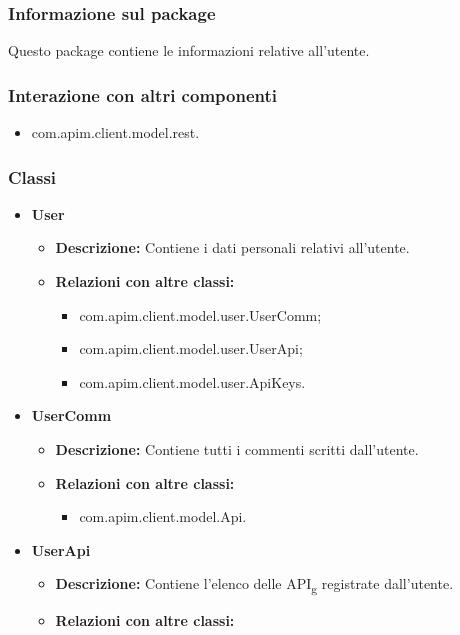 {{		\subsubsection{Informazione sul package}{
			Questo package contiene le informazioni relative all'utente.
		}
		\subsubsection{Interazione con altri componenti}{
			\begin{itemize}
				\item com.apim.client.model.rest.
			\end{itemize}
			\subsubsection{Classi}
			\begin{itemize}
				\item \textbf{User}
				\begin{itemize}
					\item \textbf{Descrizione:} Contiene i dati personali relativi all'utente.
					\item \textbf{Relazioni con altre classi:}
					\begin{itemize}
						\item com.apim.client.model.user.UserComm;
						\item com.apim.client.model.user.UserApi;
						\item com.apim.client.model.user.ApiKeys.
					\end{itemize}
				\end{itemize}
				\item \textbf{UserComm}
					\begin{itemize}
						\item \textbf{Descrizione:} Contiene tutti i commenti scritti dall'utente.
						\item \textbf{Relazioni con altre classi:}
						\begin{itemize}
							\item com.apim.client.model.Api.
						\end{itemize}
					\end{itemize}
				\item \textbf{UserApi}
					\begin{itemize}
						\item \textbf{Descrizione:} Contiene l'elenco delle API\textsubscript{g} registrate dall'utente.
						\item \textbf{Relazioni con altre classi:}

\end{itemize}
\end{itemize}}}}
